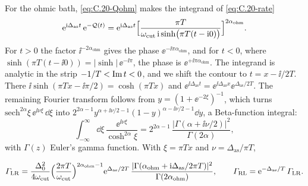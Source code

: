 For the ohmic bath, \cref{eq:C.20-Qohm} makes the integrand of \cref{eq:C.20-rate}
\begin{equation*}
  \mathrm{e}^{\mathrm{i}\Delta_{\mathrm{as}}t}\,\mathrm{e}^{-\mathcal{Q}(t)} = \mathrm{e}^{\mathrm{i}\Delta_{\mathrm{as}}t}\Bigl[\frac{\pi T}{\omega_{\mathrm{cut}}\,\mathrm{i}\sinh\bigl(\pi T(t - \mathrm{i}0)\bigr)}\Bigr]^{2\alpha_{\mathrm{ohm}}} .
\end{equation*}
For $t > 0$ the factor $\ii^{-2\alpha_{\mathrm{ohm}}}$ gives the phase $\ee^{-\ii\pi\alpha_{\mathrm{ohm}}}$, and for $t < 0$, where $\sinh(\pi T(t - \ii0)) = |\sinh|\,\ee^{-\ii\pi}$, the phase is $\ee^{+\ii\pi\alpha_{\mathrm{ohm}}}$. The integrand is analytic in the strip $-1/T < \operatorname{Im} t < 0$, and we shift the contour to $t = x - \ii/2T$. There $\ii\sinh(\pi Tx - \ii\pi/2) = \cosh(\pi Tx)$ and $\ee^{\ii\Delta_{\mathrm{as}}t} = \ee^{\ii\Delta_{\mathrm{as}}x}\ee^{\Delta_{\mathrm{as}}/2T}$. The remaining Fourier transform follows from $y = (1 + \ee^{-2\xi})^{-1}$, which turns $\mathrm{sech}^{2\alpha}\xi\,\ee^{\ii\nu\xi}\,\dd\xi$ into $2^{2\alpha - 1}y^{\alpha + \ii\nu/2 - 1}(1 - y)^{\alpha - \ii\nu/2 - 1}\dd y$, a Beta-function integral:
\begin{equation*}
  \int_{-\infty}^{\infty}\dd\xi\,\frac{\ee^{\ii\nu\xi}}{\cosh^{2\alpha}\xi} = 2^{2\alpha - 1}\,\frac{|\Gamma(\alpha + \ii\nu/2)|^2}{\Gamma(2\alpha)} ,
\end{equation*}
with $\Gamma(z)$ Euler's gamma function. With $\xi = \pi Tx$ and $\nu = \Delta_{\mathrm{as}}/\pi T$,
\begin{keyresult}
\begin{equation}
  \varGamma_{\mathrm{LR}} = \frac{\Delta_0^2}{4\omega_{\mathrm{cut}}}\Bigl(\frac{2\pi T}{\omega_{\mathrm{cut}}}\Bigr)^{2\alpha_{\mathrm{ohm}} - 1}
  \mathrm{e}^{\Delta_{\mathrm{as}}/2T}\,\frac{|\Gamma(\alpha_{\mathrm{ohm}} + \mathrm{i}\Delta_{\mathrm{as}}/2\pi T)|^2}{\Gamma(2\alpha_{\mathrm{ohm}})} ,
  \qquad \varGamma_{\mathrm{RL}} = \mathrm{e}^{-\Delta_{\mathrm{as}}/T}\,\varGamma_{\mathrm{LR}} .
  \label{eq:C.20-ohmrate}
\end{equation}
\end{keyresult}
